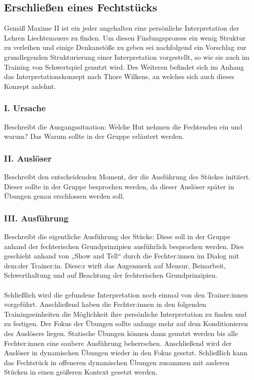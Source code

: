\newpage

\subsection{Erschließen eines Fechtstücks}

Gemäß Maxime II ist ein jeder angehalten eine persönliche Interpretation der Lehren Liechtenauers zu finden.
Um diesen Findungsprozess ein wenig Struktur zu verleihen und einige Denkanstöße zu geben sei nachfolgend ein Vorschlag zur grundlegenden Strukturierung einer Interpretation vorgestellt, so wie sie auch im Training von Schwertspiel genutzt wird.
Des Weiteren befindet sich im Anhang das Interpretationskonzept nach Thore Wilkens, an welches sich auch dieses Konzept anlehnt.

\subsubsection*{I. Ursache}

Beschreibt die Ausgangssituation: Welche Hut nehmen die Fechtenden ein und warum?
Das Warum sollte in der Gruppe erläutert werden.

\subsubsection*{II. Auslöser}

Beschreibt den entscheidenden Moment, der die Ausführung des Stückes initiiert.
Dieser sollte in der Gruppe besprochen werden, da dieser Auslöser später in Übungen genau erschlossen werden soll.

\subsubsection*{III. Ausführung}

Beschreibt die eigentliche Ausführung des Stücks: Diese soll in der Gruppe anhand der fechterischen Grundprinzipien ausführlich besprochen werden.
Dies geschieht anhand von „Show and Tell“ durch die Fechter:innen im Dialog mit dem:der Trainer:in.
Diese:r wirft das Augenmerk auf Mensur, Beinarbeit, Schwerthaltung und auf Beachtung der fechterischen Grundprinzipien.
\\
\\
Schließlich wird die gefundene Interpretation noch einmal von den Trainer:innen vorgeführt.
Anschließend haben die Fechter:innen in den folgenden Trainingseinheiten die Möglichkeit ihre persönliche Interpretation zu finden und zu festigen.
Der Fokus der Übungen sollte anfangs mehr auf dem Konditionieren des Auslösers liegen.
Statische Übungen können dann genutzt werden bis alle Fechter:innen eine saubere Ausführung beherrschen.
Anschließend wird der Auslöser in dynamischen Übungen wieder in den Fokus gesetzt.
Schließlich kann das Fechtstück in offeneren dynamischen Übungen zusammen mit anderen Stücken in einen größeren Kontext gesetzt werden.

\newpage

